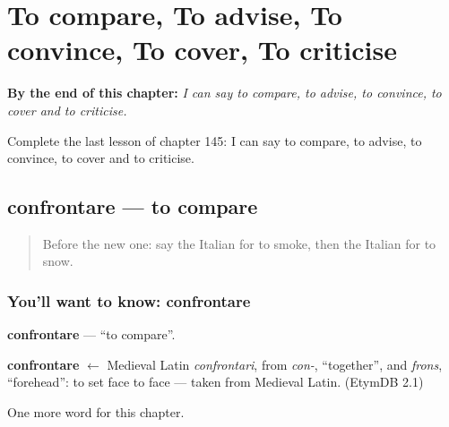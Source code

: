 
\chapter{To compare, To advise, To convince, To cover, To criticise}
\label{ch:it-to-compare-to-advise-to-convince-to-cover-to-criticise}

\begin{chapteropening}
\textbf{By the end of this chapter:} \emph{I can say to compare, to advise, to convince, to cover and to criticise.}

Complete the last lesson of chapter 145: I can say to compare, to advise, to convince, to cover and to criticise.
\end{chapteropening}

\section[confrontare]{confrontare — to compare}

\label{lesson:IT-C145-confrontare}



\begin{quote}
Before the new one: say the Italian for to smoke, then the Italian for to snow.
\end{quote}

\subsection*{You'll want to know: confrontare}
\textbf{confrontare} — \textquotedblleft{}to compare\textquotedblright{}.

\begin{cousinweb}
\textbf{confrontare} $\leftarrow$ Medieval Latin \emph{confrontari}, from \emph{con-}, \textquotedblleft{}together\textquotedblright{}, and \emph{frons}, \textquotedblleft{}forehead\textquotedblright{}: to set face to face — taken from Medieval Latin. (EtymDB 2.1)
\end{cousinweb}

\begin{grammarlens}[title={What you've built}]
One more word for this chapter.
\end{grammarlens}

